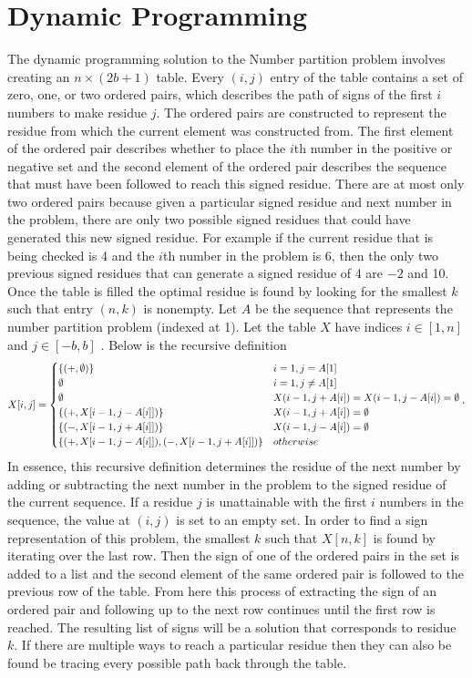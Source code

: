\documentclass[a4paper]{article}
\begin{document}
	\section{Dynamic Programming}
	The dynamic programming solution to the Number partition problem involves creating an $n \times (2b+1)$ table. Every $(i,j)$ entry of the table contains a set of zero, one, or two ordered pairs, which describes the path of signs of the first $i$ numbers to make residue $j$. The ordered pairs are constructed to represent the residue from which the current element was constructed from. The first element of the ordered pair describes whether to place the $i$th number in the positive or negative set and the second element of the ordered pair describes the sequence that must have been followed to reach this signed residue. There are at most only two ordered pairs because given a particular signed residue and next number in the problem, there are only two possible signed residues that could have generated this new signed residue. For example if the current residue that is being checked is 4 and the $i$th number in the problem is 6, then the only two previous signed residues that can generate a signed residue of 4 are $-2$ and 10. Once the table is filled the optimal residue is found by looking for the smallest $k$ such that entry $(n,k)$ is nonempty. Let $A$ be the sequence that represents the number partition problem (indexed at 1). Let the table $X$ have indices $i \in [1,n]$ and $j \in [-b,b]$ . Below is the recursive definition
	\[X[i,j] = 
	\begin{cases}
	\{(+,\emptyset)\} & i = 1, j = A[1]\\
	\emptyset & i = 1, j \neq A[1] \\ 
	\emptyset & X(i-1, j + A[i]) = X(i-1, j - A[i]) = \emptyset \\
	\{(+, X[i-1, j - A[i]])\} & X(i-1, j + A[i]) = \emptyset \\
	\{(-, X[i-1, j + A[i]])\} & X(i-1, j - A[i]) = \emptyset \\
	\{(+, X[i-1, j - A[i]]), (-, X[i-1, j + A[i]])\} & otherwise
	\end{cases}`
	\]
	In essence, this recursive definition determines the residue of the next number by adding or subtracting the next number in the problem to the signed residue of the current sequence. If a residue $j$ is unattainable with the first $i$ numbers in the sequence, the value at $(i,j)$ is set to an empty set. In order to find a sign representation of this problem, the smallest $k$ such that $X[n,k]$ is found by iterating over the last row. Then the sign of one of the ordered pairs in the set is added to a list and the second element of the same ordered pair is followed to the previous row of the table. From here this process of extracting the sign of an ordered pair and following up to the next row continues until the first row is reached. The resulting list of signs will be a solution that corresponds to residue $k$. If there are multiple ways to reach a particular residue then they can also be found be tracing every possible path back through the table. 
	
\end{document}
